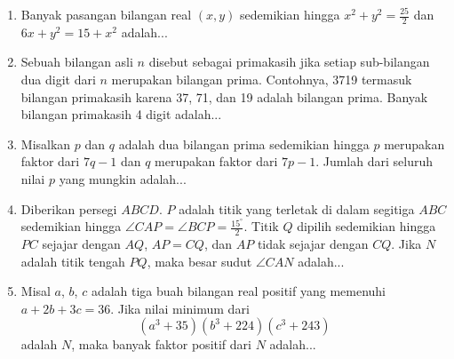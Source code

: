 \documentclass[11pt]{scrartcl}
\begin{document}
\begin{enumerate}[resume]
    \item Banyak pasangan bilangan real $(x, y)$ sedemikian hingga $x^2 + y^2 = \frac{25}{2}$ dan $6x + y^2 = 15 + x^2$ adalah...
    \item Sebuah bilangan asli $n$ disebut sebagai primakasih jika setiap sub-bilangan dua digit dari $n$ merupakan bilangan prima. Contohnya, 3719 termasuk bilangan primakasih karena 37, 71, dan 19 adalah bilangan prima. Banyak bilangan primakasih 4 digit adalah...
    \item Misalkan $p$ dan $q$ adalah dua bilangan prima sedemikian hingga $p$ merupakan faktor dari $7q - 1$ dan $q$ merupakan faktor dari $7p - 1$. Jumlah dari seluruh nilai $p$ yang mungkin adalah...
    \item Diberikan persegi $ABCD$. $P$ adalah titik yang terletak di dalam segitiga $ABC$ sedemikian hingga $\angle CAP = \angle BCP = \frac{15^\circ}{2}$. Titik $Q$ dipilih sedemikian hingga $PC$ sejajar dengan $AQ$, $AP = CQ$, dan $AP$ tidak sejajar dengan $CQ$. Jika $N$ adalah titik tengah $PQ$, maka besar sudut $\angle CAN$ adalah...
    \item Misal $a$, $b$, $c$ adalah tiga buah bilangan real positif yang memenuhi $a + 2b + 3c = 36$. Jika nilai minimum dari
        $$(a^3 + 35)(b^3 + 224)(c^3 + 243)$$
        adalah $N$, maka banyak faktor positif dari $N$ adalah...
\end{enumerate}
\end{document}
